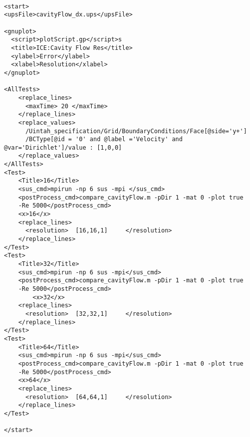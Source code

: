 \begin{verbatim}

<start>
<upsFile>cavityFlow_dx.ups</upsFile>

<gnuplot>
  <script>plotScript.gp</script>s
  <title>ICE:Cavity Flow Res</title>
  <ylabel>Error</ylabel>
  <xlabel>Resolution</xlabel>
</gnuplot>

<AllTests>
    <replace_lines>
      <maxTime> 20 </maxTime>
    </replace_lines>
    <replace_values>
      /Uintah_specification/Grid/BoundaryConditions/Face[@side='y+']
      /BCType[@id = '0' and @label ='Velocity' and @var='Dirichlet']/value : [1,0,0]
    </replace_values>
</AllTests>
<Test>
    <Title>16</Title>
    <sus_cmd>mpirun -np 6 sus -mpi </sus_cmd>
    <postProcess_cmd>compare_cavityFlow.m -pDir 1 -mat 0 -plot true
    -Re 5000</postProcess_cmd>
    <x>16</x>
    <replace_lines>
      <resolution>  [16,16,1]     </resolution>
    </replace_lines>
</Test>
<Test>
    <Title>32</Title>
    <sus_cmd>mpirun -np 6 sus -mpi</sus_cmd>
    <postProcess_cmd>compare_cavityFlow.m -pDir 1 -mat 0 -plot true
    -Re 5000</postProcess_cmd>
        <x>32</x>
    <replace_lines>
      <resolution>  [32,32,1]     </resolution>
    </replace_lines>
</Test>
<Test>
    <Title>64</Title>
    <sus_cmd>mpirun -np 6 sus -mpi</sus_cmd>
    <postProcess_cmd>compare_cavityFlow.m -pDir 1 -mat 0 -plot true
    -Re 5000</postProcess_cmd>
    <x>64</x>
    <replace_lines>
      <resolution>  [64,64,1]     </resolution>
    </replace_lines>
</Test>

</start>

\end{verbatim}

